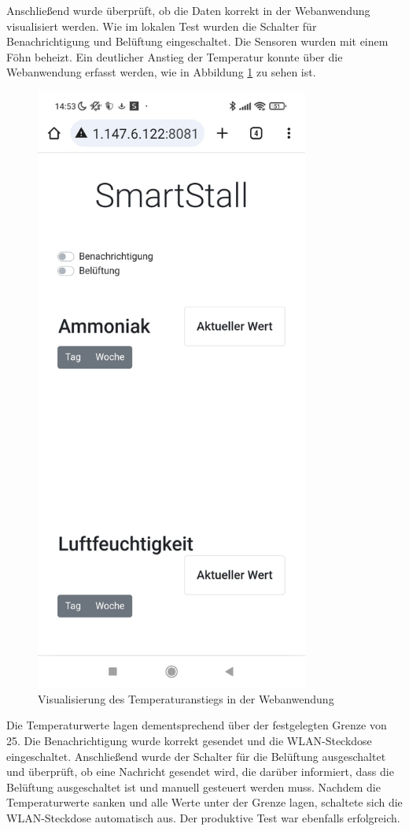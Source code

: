 \documentclass[conference]{IEEEtran}
\begin{document}
Anschließend wurde überprüft, ob die Daten korrekt in der Webanwendung visualisiert werden. Wie im lokalen Test wurden die Schalter für Benachrichtigung und Belüftung eingeschaltet. Die Sensoren wurden mit einem Föhn beheizt. Ein deutlicher Anstieg der Temperatur konnte über die Webanwendung erfasst werden, wie in Abbildung \ref{webanwendungtest} zu sehen ist. 

\begin{figure}[H]
	\centering
	\includegraphics[width=90mm]{fig/anstiegTemperatur.jpg}
	\caption{Visualisierung des Temperaturanstiegs in der Webanwendung}
	\label{webanwendungtest}
\end{figure}

Die Temperaturwerte lagen dementsprechend über der festgelegten Grenze von 25. Die Benachrichtigung wurde korrekt gesendet und die WLAN-Steckdose eingeschaltet. Anschließend wurde der Schalter für die Belüftung ausgeschaltet und überprüft, ob eine Nachricht gesendet wird, die darüber informiert, dass die Belüftung ausgeschaltet ist und manuell gesteuert werden muss. Nachdem die Temperaturwerte sanken und alle Werte unter der Grenze lagen, schaltete sich die WLAN-Steckdose automatisch aus. Der produktive Test war ebenfalls erfolgreich.
\end{document}
